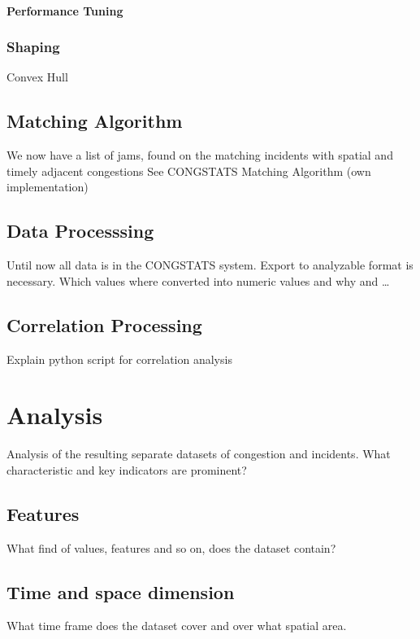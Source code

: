 \documentclass[a4paper,12pt]{report}
\begin{document}
\subsubsection{Performance Tuning}

\subsection{Shaping}

Convex Hull

\section{Matching Algorithm}
We now have a list of jams, found on the matching incidents with spatial and timely adjacent congestions
See CONGSTATS Matching Algorithm (own implementation)

\section{Data Processsing}
\label{methodology_data_generation}
Until now all data is in the CONGSTATS system. Export to analyzable format is necessary.
Which values where converted into numeric values and why and …

\section{Correlation Processing}
\label{definition_correlation_script}

Explain python script for correlation analysis

\cite{Potvin2020}


\chapter{Analysis}

Analysis of the resulting separate datasets of congestion and incidents. What characteristic and key indicators are prominent?
\section{Features}
What find of values, features and so on, does the dataset contain?
\section{Time and space dimension}
What time frame does the dataset cover and over what spatial area.
\end{document}
